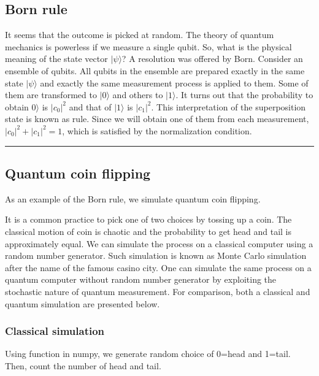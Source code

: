 \documentclass[letterpaper,10pt,english]{jupyterBook}
\begin{document}
\subsection{Born rule}
\label{\detokenize{qubit/measurement:born-rule}}
\sphinxAtStartPar
It seems that the outcome is picked at random. The theory of quantum mechanics is powerless if we measure a single qubit.  So, what is the physical meaning of the state vector \(|\psi\rangle\)?  A resolution was offered by Born. Consider an ensemble of qubits. All qubits in the ensemble are prepared exactly in the same state \(|\psi\rangle\) and exactly the same measurement process is applied to them. Some of them are transformed to \(|0\rangle\) and others to \(|1\rangle\).  It turns out that the probability to obtain \(0\rangle\) is \(|c_0|^2\) and that of \(|1\rangle\) is \(|c_1|^2\). This interpretation of the superposition state is known as  rule.  Since we will obtain one of them from each measurement, \(|c_0|^2+|c_1|^2=1\), which is satisfied by the normalization condition.


\bigskip\hrule\bigskip



\subsection{Quantum coin flipping}
\label{\detokenize{qubit/measurement:quantum-coin-flipping}}
\sphinxAtStartPar
As an example of the Born rule, we simulate quantum coin flipping.

\sphinxAtStartPar
It is a common practice to pick one of two choices by tossing up a coin.  The classical motion of coin is chaotic and the probability to get head and tail is approximately equal. We can simulate the process on a classical computer using a random number generator.  Such simulation is known as Monte Carlo simulation after the name of the famous casino city.  One can simulate the same process on a quantum computer without random number generator by exploiting the stochastic nature of quantum measurement.  For comparison, both a classical and quantum simulation are presented below.


\subsubsection{Classical simulation}
\label{\detokenize{qubit/measurement:classical-simulation}}
\sphinxAtStartPar
Using  function in numpy, we generate random choice of 0=head and 1=tail.  Then, count the number of head and tail.
\end{document}
